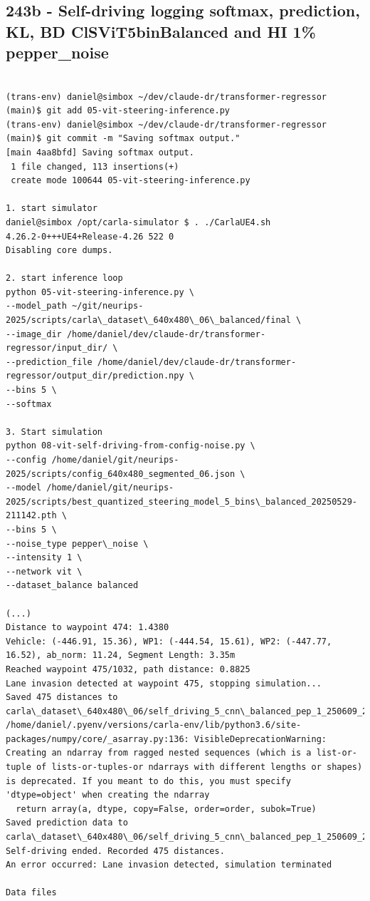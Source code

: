 \subsection{243b - Self-driving logging softmax, prediction, KL, BD ClSViT5binBalanced and HI 1\% pepper\_noise}
\label{app_res:243b}

\begin{verbatim}

(trans-env) daniel@simbox ~/dev/claude-dr/transformer-regressor (main)$ git add 05-vit-steering-inference.py
(trans-env) daniel@simbox ~/dev/claude-dr/transformer-regressor (main)$ git commit -m "Saving softmax output."
[main 4aa8bfd] Saving softmax output.
 1 file changed, 113 insertions(+)
 create mode 100644 05-vit-steering-inference.py
 
1. start simulator
daniel@simbox /opt/carla-simulator $ . ./CarlaUE4.sh 
4.26.2-0+++UE4+Release-4.26 522 0
Disabling core dumps.

2. start inference loop
python 05-vit-steering-inference.py \
--model_path ~/git/neurips-2025/scripts/carla\_dataset\_640x480\_06\_balanced/final \
--image_dir /home/daniel/dev/claude-dr/transformer-regressor/input_dir/ \
--prediction_file /home/daniel/dev/claude-dr/transformer-regressor/output_dir/prediction.npy \
--bins 5 \
--softmax

3. Start simulation
python 08-vit-self-driving-from-config-noise.py \
--config /home/daniel/git/neurips-2025/scripts/config_640x480_segmented_06.json \
--model /home/daniel/git/neurips-2025/scripts/best_quantized_steering_model_5_bins\_balanced_20250529-211142.pth \
--bins 5 \
--noise_type pepper\_noise \
--intensity 1 \
--network vit \
--dataset_balance balanced

(...)
Distance to waypoint 474: 1.4380
Vehicle: (-446.91, 15.36), WP1: (-444.54, 15.61), WP2: (-447.77, 16.52), ab_norm: 11.24, Segment Length: 3.35m
Reached waypoint 475/1032, path distance: 0.8825
Lane invasion detected at waypoint 475, stopping simulation...
Saved 475 distances to carla\_dataset\_640x480\_06/self_driving_5_cnn\_balanced_pep_1_250609_2345.txt
/home/daniel/.pyenv/versions/carla-env/lib/python3.6/site-packages/numpy/core/_asarray.py:136: VisibleDeprecationWarning: Creating an ndarray from ragged nested sequences (which is a list-or-tuple of lists-or-tuples-or ndarrays with different lengths or shapes) is deprecated. If you meant to do this, you must specify 'dtype=object' when creating the ndarray
  return array(a, dtype, copy=False, order=order, subok=True)
Saved prediction data to carla\_dataset\_640x480\_06/self_driving_5_cnn\_balanced_pep_1_250609_2345.npy
Self-driving ended. Recorded 475 distances.
An error occurred: Lane invasion detected, simulation terminated

Data files

\end{verbatim}

